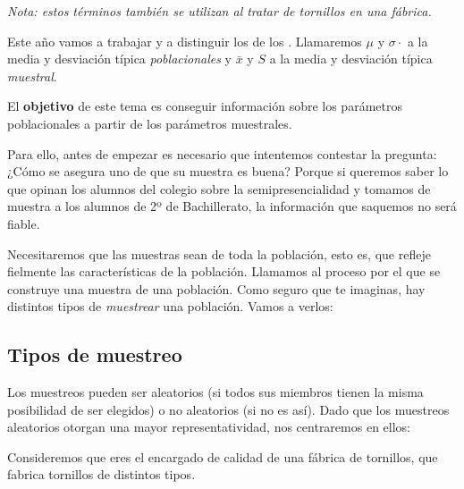 \begin{defn}[Individuo]
\end{defn}

\textit{Nota: estos términos también se utilizan al tratar de tornillos en una fábrica.}

Este año vamos a trabajar y a distinguir los  de los .
%
Llamaremos $\mu$ y $\sigma·$ a la media y desviación típica \emph{poblacionales} y $\bar{x}$ y $S$ a la media y desviación típica \emph{muestral}.

El \textbf{objetivo} de este tema es conseguir información sobre los parámetros poblacionales a partir de los parámetros muestrales. 

Para ello, antes de empezar es necesario que intentemos contestar la pregunta: ¿Cómo se asegura uno de que su muestra es buena? Porque si queremos saber lo que opinan los alumnos del colegio sobre la semipresencialidad y tomamos de muestra a los alumnos de 2º de Bachillerato, la información que saquemos no será fiable.

Necesitaremos que las muestras sean  de toda la población, esto es, que refleje fielmente las características de la población.
%
Llamamos  al proceso por el que se construye una muestra de una población. 
%
Como seguro que te imaginas, hay distintos tipos de \textit{muestrear} una población. Vamos a verlos:

\subsection{Tipos de muestreo}

Los muestreos pueden ser aleatorios (si todos sus miembros tienen la misma posibilidad de ser elegidos) o no aleatorios (si no es así).
%
Dado que los muestreos aleatorios otorgan una mayor representatividad, nos centraremos en ellos:

Consideremos que eres el encargado de calidad de una fábrica de tornillos, que fabrica tornillos de distintos tipos.

